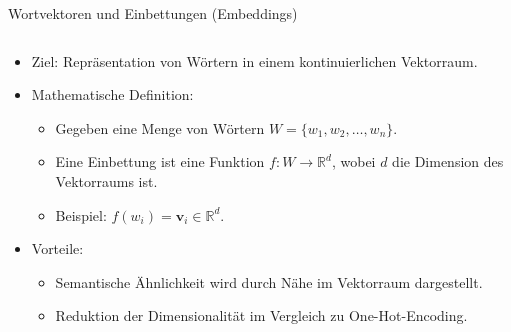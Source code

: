 \documentclass[aspectratio=1610, xcolor=dvipsnames, 9pt]{beamer}
\begin{document}
\begin{frame}{Wortvektoren und Einbettungen (Embeddings)}
  \begin{columns}
    \begin{column}{1\textwidth}
      \begin{itemize}
        \item Ziel: Repräsentation von Wörtern in einem kontinuierlichen Vektorraum.
        \item Mathematische Definition:
          \begin{itemize}
            \item Gegeben eine Menge von Wörtern \( W = \{w_1, w_2, \dots, w_n\} \).
            \item Eine Einbettung ist eine Funktion \( f: W \to \mathbb{R}^d \), wobei \( d \) die Dimension des Vektorraums ist.
            \item Beispiel: \( f(w_i) = \mathbf{v}_i \in \mathbb{R}^d \).
          \end{itemize}
        \item Vorteile:
          \begin{itemize}
            \item Semantische Ähnlichkeit wird durch Nähe im Vektorraum dargestellt.
            \item Reduktion der Dimensionalität im Vergleich zu One-Hot-Encoding.
          \end{itemize}
      \end{itemize}
    \end{column}
  \end{columns}
\end{frame}
\end{document}
